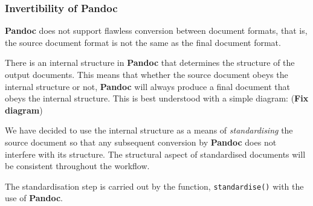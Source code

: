 \documentclass[a4paper, 12pt]{report}
\begin{document}
\subsubsection*{Invertibility of \textbf{Pandoc}}
\textbf{Pandoc} does not support flawless conversion between document formats, that is, the source document format is not the same as the final document format.

There is an internal structure in \textbf{Pandoc} that determines the structure of the output documents. This means that whether the source document obeys the internal structure or not, \textbf{Pandoc} will always produce a final document that obeys the internal structure. This is best understood with a simple diagram:
(\textbf{Fix diagram})
\begin{figure}[h!]
\centering
\end{figure}

We have decided to use the internal structure as a means of \emph{standardising} the source document so that any subsequent conversion by \textbf{Pandoc} does not interfere with its structure. The structural aspect of standardised documents will be consistent throughout the workflow.

The standardisation step is carried out by the function, \texttt{standardise()} with the use of \textbf{Pandoc}.
\end{document}
